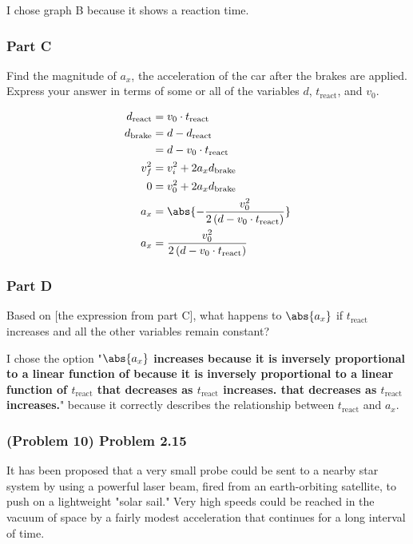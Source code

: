 \begin{solution}
	I chose graph B because it shows a reaction time.
\end{solution}

\subsubsection{Part C}
Find the magnitude of $a_x$, the acceleration of the car after the brakes are applied. Express your answer in terms of some or all of the variables $d$, $t_{\mathrm{react}}$, and $v_0$.

\begin{solution}
	\begin{align*}
		d_{\mathrm{react}} &= v_0 \cdot t_{\mathrm{react}} \\
		d_{\mathrm{brake}} &= d-d_{\mathrm{react}} \\
		&= d-v_0 \cdot t_{\mathrm{react}} \\
		v_{f}^2 &= v_{i}^2 + 2a_{x}d_{\mathrm{brake}} \\
		0 &= v_0^2 + 2a_{x}d_{\mathrm{brake}} \\
		a_{x} &= \abs{ - \frac{v_0^2}{2 \left( d-v_0 \cdot t_{\mathrm{react}} \right)} }  \\
		a_{x} &= \frac{v_0^2}{2 \left( d-v_0 \cdot t_{\mathrm{react}} \right)} \\
	\end{align*}
\end{solution}

\subsubsection{Part D}
Based on [the expression from part C], what happens to $\abs{ a_{x} }$ if $t_{\mathrm{react}}$ increases and all the other variables remain constant?

\begin{solution}
	I chose the option "\textbf{$\abs{ a_x }$ increases because it is inversely proportional to a linear function of because it is inversely proportional to a linear function of  $t_{\mathrm{react}}$ that decreases as  $t_{\mathrm{react}}$ increases. that decreases as $t_{\mathrm{react}}$ increases.}" because it correctly describes the relationship between $t_{\mathrm{react}}$ and $a_{x}$.
\end{solution}

\newpage

\subsubsection{(Problem 10) Problem 2.15}
It has been proposed that a very small probe could be sent to a nearby star system by using a powerful laser beam, fired from an earth-orbiting satellite, to push on a lightweight "solar sail." Very high speeds could be reached in the vacuum of space by a fairly modest acceleration that continues for a long interval of time.

